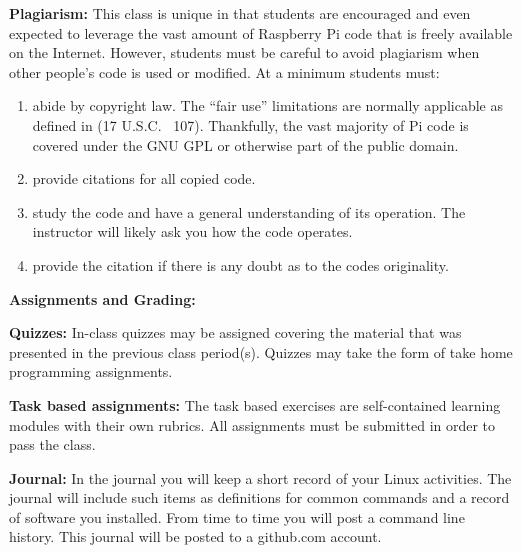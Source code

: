 \documentclass[12pt]{article}
\begin{document}
\vspace*{.15in}
\noindent\textbf{Plagiarism:} This class is unique in that students are encouraged and even expected to leverage the vast amount of Raspberry Pi code that is freely available on the Internet.  However, students must be careful to avoid plagiarism when other people's code is used or modified.  At a minimum students must:
\begin{enumerate}
    \item abide by copyright law.  The “fair use” limitations are normally applicable as defined in (17 U.S.C. \textsection\ 107).  Thankfully, the vast majority of Pi code is covered under the GNU GPL or otherwise part of the public domain.

    \item provide citations for all copied code.

    \item study the code and have a general understanding of its operation.  The instructor will likely ask you how the code operates.

    \item provide the citation if there is any doubt as to the codes originality.
\end{enumerate}



\vspace*{.15in}

\newpage

\vspace*{.15in}
\noindent\textbf{Assignments and Grading:}




\vspace*{.15in}
\textbf{Quizzes:}  In-class quizzes may be assigned covering the material that was presented in the previous class period(s).  Quizzes may take the form of take home programming assignments.


\vspace*{.15in}
\textbf{Task based assignments:}
The task based exercises are self-contained learning modules with their own rubrics. All assignments must be submitted in order to pass the class.


\vspace*{.15in}
\textbf{Journal:}
In the journal you will keep a short record of your Linux activities. The journal will include such items as definitions for common commands and a record of software you installed. From time to time you will post a command line history. This journal will be posted to a github.com account.
\end{document}
